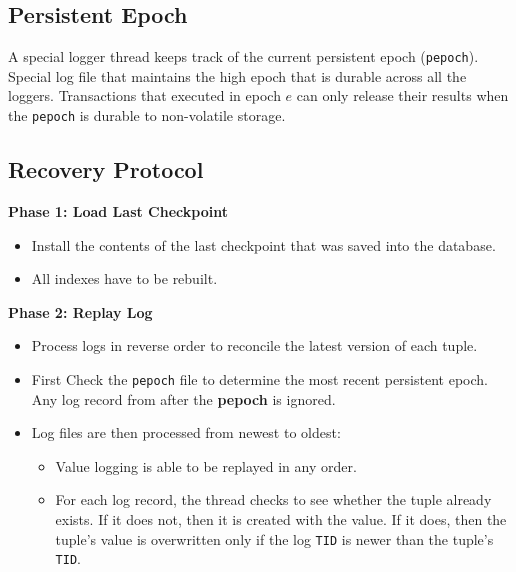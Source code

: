 \documentclass[11pt]{article}
\begin{document}
\subsection{Persistent Epoch}
A special logger thread keeps track of the current persistent epoch (\texttt{pepoch}).
Special log file that maintains the high epoch that is durable across all the loggers.
Transactions that executed in epoch \textbf{$e$} can only release their results when the 
\texttt{pepoch} is durable to non-volatile storage.

\subsection{Recovery Protocol}
\textbf{Phase 1: Load Last Checkpoint}
\begin{itemize}
    \item
    Install the contents of the last checkpoint that was saved into the database.
    
    \item
    All indexes have to be rebuilt.
\end{itemize}

\textbf{Phase 2: Replay Log}
\begin{itemize}
    \item
    Process logs in reverse order to reconcile the latest version of each tuple.
    
    \item
    First Check the \texttt{pepoch} file to determine the most recent persistent epoch.
    Any log record from after the \textbf{pepoch} is ignored.
    
    \item Log files are then processed from newest to oldest:
    \begin{itemize}
        \item
        Value logging is able to be replayed in any order.
        
        \item
        For each log record, the thread checks to see whether the tuple already exists.
        If it does not, then it is created with the value.
        If it does, then the tuple's value is overwritten only if the log \texttt{TID} is newer 
        than the tuple's \texttt{TID}.
    \end{itemize}
\end{itemize}
\end{document}
